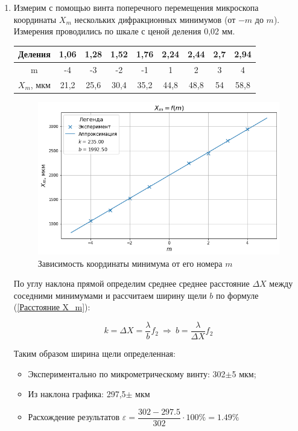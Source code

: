\documentclass[a4paper, 12pt]{article}
\begin{document}
\begin{enumerate}
	\item Измерим с помощью винта поперечного перемещения микроскопа координаты $X_m$ нескольких дифракционных минимумов (от $-m$ до $m$). Измерения проводились по шкале с ценой деления 0,02 мм.

	\begin{center}
		\begin{tabular}{|c|c|c|c|c|c|c|c|c|}
			\hline
			Деления   & 1,06 & 1,28 & 1,52 & 1,76 & 2,24 & 2,44 & 2,7 & 2,94 \\ \hline
			m         & -4   & -3   & -2   & -1   & 1    & 2    & 3   & 4    \\ \hline
			$X_m$, мкм & 21,2 & 25,6 & 30,4 & 35,2 & 44,8 & 48,8 & 54  & 58,8 \\ \hline
		\end{tabular}
	\end{center}

	\begin{figure}[h!]
		\begin{center}
		\includegraphics[width=1\textwidth]{graph2.png}
		\caption{Зависимость координаты минимума от его номера $m$}
		\end{center}
	\end{figure}

	По углу наклона прямой определим среднее среднее расстояние $\Delta X$ между соседними минимумами и рассчитаем ширину щели $b$ по формуле (\ref{Расстояние X_m}):

\[k = \Delta X = \dfrac{\lambda}{b}f_2~\Rightarrow~b=\dfrac{\lambda}{\Delta X}f_2\]

Таким образом ширина щели определенная:
\begin{itemize}
	\item Экспериментально по микрометрическому винту: 302$\pm$5 мкм;
	\item Из наклона графика: 297,5$\pm$ мкм
	\item Расхождение результатов $\varepsilon = \dfrac{302 - 297.5}{302} \cdot 100\% = 1.49\%$
\end{itemize}
\end{enumerate}
\end{document}
